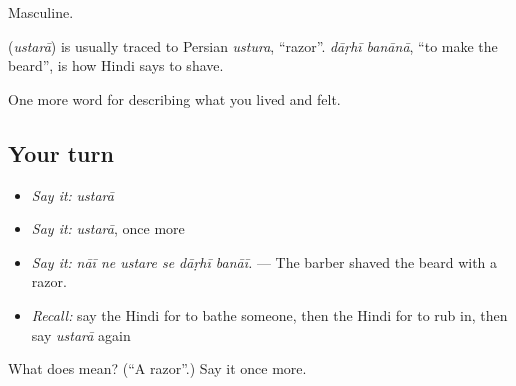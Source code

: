 Masculine.

\begin{cousinweb}
\textbf{} (\emph{ustarā}) is usually traced to Persian \emph{ustura}, \textquotedblleft{}razor\textquotedblright{}. \emph{dāṛhī banānā}, \textquotedblleft{}to make the beard\textquotedblright{}, is how Hindi says to shave.
\end{cousinweb}

\begin{grammarlens}[title={What you've built}]
One more word for describing what you lived and felt.
\end{grammarlens}

\subsection*{Your turn}
\begin{itemize}
\raggedright
  \item \emph{Say it:} \emph{ustarā}
  \item \emph{Say it:} \emph{ustarā}, once more
  \item \emph{Say it:} \emph{nāī ne ustare se dāṛhī banāī.} — The barber shaved the beard with a razor.
  \item \emph{Recall:} say the Hindi for to bathe someone, then the Hindi for to rub in, then say \emph{ustarā} again
\end{itemize}

\begin{tcolorbox}[breakable,colback=teal!4,colframe=teal!35!black,title={Before you move on}]
What does  mean? (\textquotedblleft{}A razor\textquotedblright{}.) Say it once more.
\end{tcolorbox}
